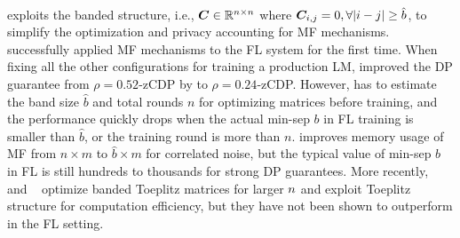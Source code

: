 \paragraph{\bandmf}
\citet{choquette2023amplified} exploits the banded structure, i.e., ${\bm{C}} \in \mathbb{R}^{n\times n}$ where ${\bm{C}}_{i,j}=0, \forall |i-j| \geq \hat{b}$, to simplify the optimization and privacy accounting for MF mechanisms. \bandmf successfully applied MF mechanisms to the FL system for the first time. When fixing all the other configurations for training a production LM, \bandmf improved the DP guarantee from $\rho=0.52$-zCDP by \treeagg to $\rho=0.24$-zCDP. However, \bandmf has to estimate the band size $\hat{b}$ and total rounds $n$ for optimizing matrices before training, and the performance quickly drops when the actual min-sep $b$ in FL training is smaller than $\hat{b}$, or the training round is more than $n$. \bandmf improves memory usage of MF from $n\times m$ to $\hat{b} \times m$ for correlated noise, but the typical value of min-sep $b$ in FL is still hundreds to thousands for strong DP guarantees. More recently, \bandfhu~\citep{kalinin2024banded} and \bandtoep~\citep{mckenna2024scaling} optimize banded Toeplitz matrices for larger $n$ and exploit Toeplitz structure for computation efficiency, but they have not been shown to outperform \bandmf in the FL setting.